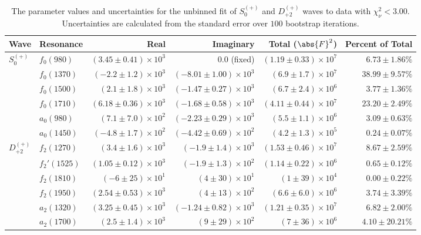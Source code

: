 \begin{table}[ht]
    \begin{center}
        \begin{tabular}{llrrrr}\toprule
        Wave & Resonance & Real & Imaginary & Total ($\abs{F}^2$) & Percent of Total \\\midrule
$S_{0}^{(+)}$ & $f_{0}(980)$ & $(3.45 \pm 0.41) \times 10^{3}$ & $0.0$ (fixed) & $(1.19 \pm 0.33) \times 10^{7}$ & $6.73 \pm 1.86 \%$ \\
 & $f_{0}(1370)$ & $(-2.2 \pm 1.2) \times 10^{3}$ & $(-8.01 \pm 1.00) \times 10^{3}$ & $(6.9 \pm 1.7) \times 10^{7}$ & $38.99 \pm 9.57 \%$ \\
 & $f_{0}(1500)$ & $(2.1 \pm 1.8) \times 10^{3}$ & $(-1.47 \pm 0.27) \times 10^{3}$ & $(6.7 \pm 2.4) \times 10^{6}$ & $3.77 \pm 1.36 \%$ \\
 & $f_{0}(1710)$ & $(6.18 \pm 0.36) \times 10^{3}$ & $(-1.68 \pm 0.58) \times 10^{3}$ & $(4.11 \pm 0.44) \times 10^{7}$ & $23.20 \pm 2.49 \%$ \\
 & $a_{0}(980)$ & $(7.1 \pm 7.0) \times 10^{2}$ & $(-2.23 \pm 0.29) \times 10^{3}$ & $(5.5 \pm 1.1) \times 10^{6}$ & $3.09 \pm 0.63 \%$ \\
 & $a_{0}(1450)$ & $(-4.8 \pm 1.7) \times 10^{2}$ & $(-4.42 \pm 0.69) \times 10^{2}$ & $(4.2 \pm 1.3) \times 10^{5}$ & $0.24 \pm 0.07 \%$ \\
$D_{+2}^{(+)}$ & $f_{2}(1270)$ & $(3.4 \pm 1.6) \times 10^{3}$ & $(-1.9 \pm 1.4) \times 10^{3}$ & $(1.53 \pm 0.46) \times 10^{7}$ & $8.67 \pm 2.59 \%$ \\
 & $f_{2}'(1525)$ & $(1.05 \pm 0.12) \times 10^{3}$ & $(-1.9 \pm 1.3) \times 10^{2}$ & $(1.14 \pm 0.22) \times 10^{6}$ & $0.65 \pm 0.12 \%$ \\
 & $f_{2}(1810)$ & $(-6 \pm 25) \times 10^{1}$ & $(4 \pm 30) \times 10^{1}$ & $(1 \pm 39) \times 10^{4}$ & $0.00 \pm 0.22 \%$ \\
 & $f_{2}(1950)$ & $(2.54 \pm 0.53) \times 10^{3}$ & $(4 \pm 13) \times 10^{2}$ & $(6.6 \pm 6.0) \times 10^{6}$ & $3.74 \pm 3.39 \%$ \\
 & $a_{2}(1320)$ & $(3.25 \pm 0.45) \times 10^{3}$ & $(-1.24 \pm 0.82) \times 10^{3}$ & $(1.21 \pm 0.35) \times 10^{7}$ & $6.82 \pm 2.00 \%$ \\
 & $a_{2}(1700)$ & $(2.5 \pm 1.4) \times 10^{3}$ & $(9 \pm 29) \times 10^{2}$ & $(7 \pm 36) \times 10^{6}$ & $4.10 \pm 20.21 \%$ \\\bottomrule
        \end{tabular}
    \caption{The parameter values and uncertainties for the unbinned fit of $S_{0}^{(+)}$ and $D_{+2}^{(+)}$ waves to data with $\chi^2_\nu < 3.00$. Uncertainties are calculated from the standard error over $100$ bootstrap iterations.}\label{tab:unbinned-fit-chisqdof-3.0-Sp0p-Dp2p}
    \end{center}
\end{table}

